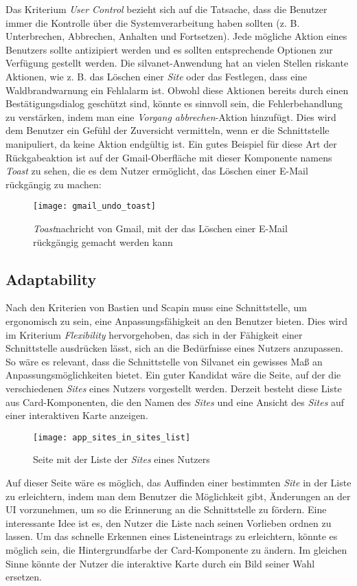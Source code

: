 Das Kriterium \textit{User Control} bezieht sich auf die Tatsache, dass die Benutzer immer die Kontrolle über die Systemverarbeitung haben sollten (z. B. Unterbrechen, Abbrechen, Anhalten und Fortsetzen).
Jede mögliche Aktion eines Benutzers sollte antizipiert werden und es sollten entsprechende Optionen zur Verfügung gestellt werden.
Die silvanet-Anwendung hat an vielen Stellen riskante Aktionen, wie z. B. das Löschen einer \textit{Site} oder das Festlegen, dass eine Waldbrandwarnung ein Fehlalarm ist.
Obwohl diese Aktionen bereits durch einen Bestätigungsdialog geschützt sind, könnte es sinnvoll sein, die Fehlerbehandlung zu verstärken, indem man eine \textit{Vorgang abbrechen}-Aktion hinzufügt.
Dies wird dem Benutzer ein Gefühl der Zuversicht vermitteln, wenn er die Schnittstelle manipuliert, da keine Aktion endgültig ist.
Ein gutes Beispiel für diese Art der Rückgabeaktion ist auf der Gmail-Oberfläche mit dieser Komponente namens \textit{Toast} zu sehen, die es dem Nutzer ermöglicht, das Löschen einer E-Mail rückgängig zu machen:

\begin{figure}[H]
  \centering
  \texttt{[image: gmail\_undo\_toast]}
  \caption{\textit{Toast}nachricht von Gmail, mit der das Löschen einer E-Mail rückgängig gemacht werden kann}
  \label{fig:gmail_undo_toast}
\end{figure}


\subsection{Adaptability}

Nach den Kriterien von Bastien und Scapin muss eine Schnittstelle, um ergonomisch zu sein, eine Anpassungsfähigkeit an den Benutzer bieten.
Dies wird im Kriterium \textit{Flexibility} hervorgehoben, das sich in der Fähigkeit einer Schnittstelle ausdrücken lässt, sich an die Bedürfnisse eines Nutzers anzupassen.
So wäre es relevant, dass die Schnittstelle von Silvanet ein gewisses Maß an Anpassungsmöglichkeiten bietet.
Ein guter Kandidat wäre die Seite, auf der die verschiedenen \textit{Sites} eines Nutzers vorgestellt werden.
Derzeit besteht diese Liste aus Card-Komponenten, die den Namen des \textit{Sites} und eine Ansicht des \textit{Sites} auf einer interaktiven Karte anzeigen.

\begin{figure}[H]
  \centering
  \texttt{[image: app\_sites\_in\_sites\_list]}
  \caption{Seite mit der Liste der \textit{Sites} eines Nutzers}
  \label{fig:app_sites_in_sites_list}
\end{figure}

Auf dieser Seite wäre es möglich, das Auffinden einer bestimmten \textit{Site} in der Liste zu erleichtern, indem man dem Benutzer die Möglichkeit gibt, Änderungen an der \ac{UI} vorzunehmen, um so die Erinnerung an die Schnittstelle zu fördern.
Eine interessante Idee ist es, den Nutzer die Liste nach seinen Vorlieben ordnen zu lassen.
Um das schnelle Erkennen eines Listeneintrags zu erleichtern, könnte es möglich sein, die Hintergrundfarbe der Card-Komponente zu ändern.
Im gleichen Sinne könnte der Nutzer die interaktive Karte durch ein Bild seiner Wahl ersetzen.

